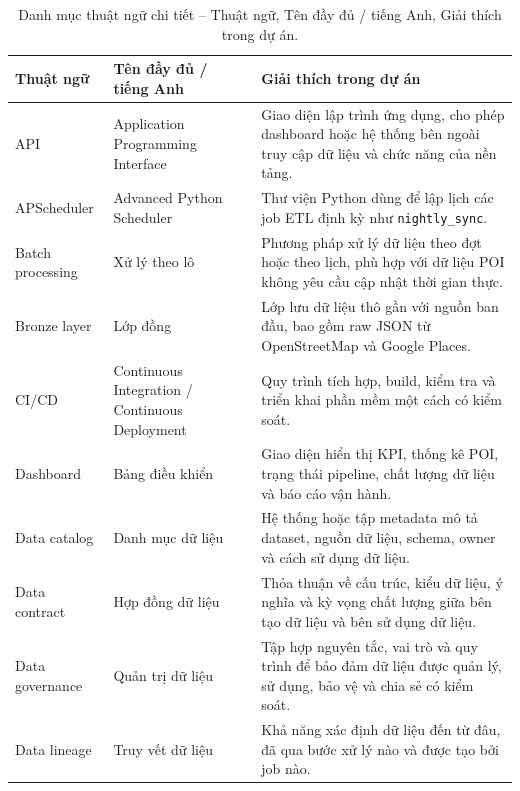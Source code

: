 \documentclass[12pt,a4paper]{article}
\begin{document}
\begin{longtable}{@{}p{}p{}p{}@{}}
\caption{Danh mục thuật ngữ chi tiết -- Thuật ngữ, Tên đầy đủ / tiếng Anh, Giải thích trong dự án.}\\
\toprule
\textbf{Thuật ngữ} & \textbf{Tên đầy đủ / tiếng Anh} & \textbf{Giải thích trong dự án} \\
\midrule
\endhead

API & Application Programming Interface & Giao diện lập trình ứng dụng, cho phép dashboard hoặc hệ thống bên ngoài truy cập dữ liệu và chức năng của nền tảng. \\

APScheduler & Advanced Python Scheduler & Thư viện Python dùng để lập lịch các job ETL định kỳ như \texttt{nightly\_sync}. \\

Batch processing & Xử lý theo lô & Phương pháp xử lý dữ liệu theo đợt hoặc theo lịch, phù hợp với dữ liệu POI không yêu cầu cập nhật thời gian thực. \\

Bronze layer & Lớp đồng & Lớp lưu dữ liệu thô gần với nguồn ban đầu, bao gồm raw JSON từ OpenStreetMap và Google Places. \\

CI/CD & Continuous Integration / Continuous Deployment & Quy trình tích hợp, build, kiểm tra và triển khai phần mềm một cách có kiểm soát. \\

Dashboard & Bảng điều khiển & Giao diện hiển thị KPI, thống kê POI, trạng thái pipeline, chất lượng dữ liệu và báo cáo vận hành. \\

Data catalog & Danh mục dữ liệu & Hệ thống hoặc tập metadata mô tả dataset, nguồn dữ liệu, schema, owner và cách sử dụng dữ liệu. \\

Data contract & Hợp đồng dữ liệu & Thỏa thuận về cấu trúc, kiểu dữ liệu, ý nghĩa và kỳ vọng chất lượng giữa bên tạo dữ liệu và bên sử dụng dữ liệu. \\

Data governance & Quản trị dữ liệu & Tập hợp nguyên tắc, vai trò và quy trình để bảo đảm dữ liệu được quản lý, sử dụng, bảo vệ và chia sẻ có kiểm soát. \\

Data lineage & Truy vết dữ liệu & Khả năng xác định dữ liệu đến từ đâu, đã qua bước xử lý nào và được tạo bởi job nào. \\


\end{longtable}
\end{document}
